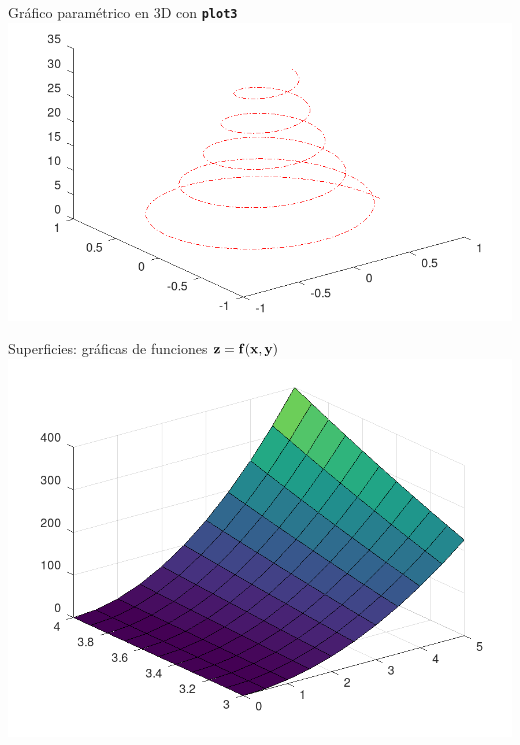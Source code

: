 \documentclass[8pt]{extarticle}
\newcommand{\cmdo}[1]{\texttt{\small\bfseries#1}} %
\begin{document}
\begin{multicols}{3}
        \begin{exampleBlock}{Gr\'afico param\'etrico en 3D con \cmdo{plot3}}
            \quad\\
            \includegraphics[width=\textwidth]{plots/plot3.png}
        \end{exampleBlock}
        
        \begin{exampleBlock}{Superficies: gr\'aficas de funciones $\bf{z=f(x,y)}$}
            \quad\\
            \includegraphics[width=\textwidth]{plots/surfer.png}\\[-0.2em]
            

\end{exampleBlock}
\end{multicols}
\end{document}

